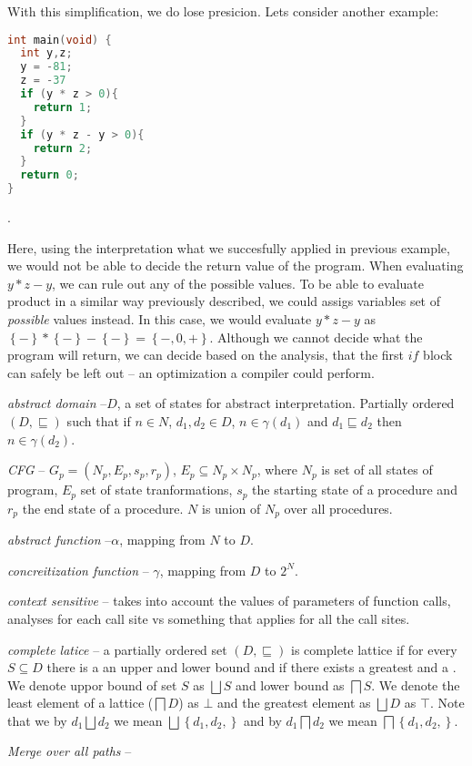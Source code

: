 \documentclass[..thesis.tex]{subfiles}
\begin{document}
With this simplification, we do lose presicion. Lets consider another example:

\begin{lstlisting}[language=C,style=def]
int main(void) {
  int y,z;
  y = -81;
  z = -37
  if (y * z > 0){
    return 1;
  }
  if (y * z - y > 0){
    return 2;
  }
  return 0;
}
\end{lstlisting}.

Here, using the interpretation what we succesfully applied in previous example, we would not be able to decide the return value of the program. 
When evaluating $y * z - y $, we can rule out any of the possible values. To be able to evaluate product in a similar way previously described,
we could assigs variables set of \textit{possible} values instead. In this case, we would evaluate $y * z - y $ as $\left\lbrace - \right\rbrace * \left\lbrace
- \right\rbrace - \left\lbrace - \right\rbrace = \left\lbrace -,0,+ \right\rbrace$. Although we cannot decide what the program will return,
we can decide based on the analysis, that the first $if$ block can safely be left out -- an optimization a compiler could perform.









  


\textit{abstract domain} --$D$,  a set of states for abstract interpretation. Partially ordered $\left(D,\sqsubseteq \right)$ such that if $n \in N$, $d_1,d_2 \in D$,  $n \in \gamma \left(d_1 \right) $ and $d_1 \sqsubseteq d_2$ then $n \in \gamma \left(d_2 \right)$.

\textit{CFG} -- $G_p=\left(N_p,E_p,s_p,r_p\right)$, $E_p \subseteq N_p \times N_p$, where $N_p$ is set of all states of program, $E_p$ set of state tranformations, $s_p$ the starting state of a procedure and $r_p$ the end state of a procedure. $N$ is union of $N_p$ over all procedures.

\textit{abstract function} --$\alpha$,  mapping from $N$ to $D$.

\textit{concreitization function} -- $\gamma$, mapping from $D$ to $2^N$.


\textit{context sensitive} -- takes into account the values of parameters of function calls, analyses for each call site vs something that applies for all the call sites.

\textit{complete latice} -- a partially ordered set $\left( D,\sqsubseteq \right)$ is complete lattice if for every $S \subseteq D$ there is a an upper and lower bound and if there exists a greatest and a . We denote uppor bound of set $S$ as $\bigsqcup S $ and lower bound as $\bigsqcap S$. We denote the least element of a lattice ($\bigsqcap D$) as $\bot$ and the greatest element as $\bigsqcup D$ as $\top$. Note that we by $d_1 \bigsqcup d_2$ we mean  $\bigsqcup \left\lbrace d_1, d_2, \right\rbrace $   and by $ d_1 \bigsqcap d_2$ we mean $\bigsqcap \left\lbrace d_1, d_2, \right\rbrace $.

 

\textit{Merge over all paths} -- 
\end{document}

